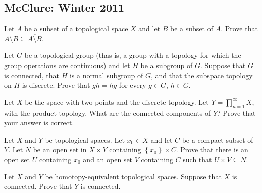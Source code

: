 \subsection{McClure: Winter 2011}
\setcounter{exercise}{0}

\begin{problem}
  Let $A$ be a subset of a topological space $X$ and let $B$ be a subset of
  $A$. Prove that $\bar A\setminus\bar B\subseteq\overline{A\setminus B}$.
\end{problem}
\begin{solution}
\end{solution}

\begin{problem}
  Let $G$ be a topological group (thas is, a group with a topology for
  which the group operations are continuous) and let $H$ be a subgroup of
  $G$. Suppose that $G$ is connected, that $H$ is a normal subgroup of $G$,
  and that the subspace topology on $H$ is discrete. Prove that
  $g h=hg$ for every $g\in G$, $h\in G$.
\end{problem}
\begin{solution}
\end{solution}

\begin{problem}
  Let $X$ be the space with two points and the discrete topology. Let
  $Y=\prod_{n=1}^\infty X$, with the product topology. What are the
  connected components of $Y$? Prove that your answer is correct.
\end{problem}
\begin{solution}
\end{solution}

\begin{problem}
  Let $X$ and $Y$ be topological spaces. Let $x_0\in X$ and let $C$ be a
  compact subset of $Y$. Let $N$ be an open set in $X\times Y$ containing
  $\left\{x_0\right\}\times C$. Prove that there is an open set $U$
  containing $x_0$ and an open set $V$ containing $C$ such that
  $U\times V\subseteq N$.
\end{problem}
\begin{solution}
\end{solution}

\begin{problem}
  Let $X$ and $Y$ be homotopy-equivalent topological spaces. Suppose that
  $X$ is connected. Prove that $Y$ is connected.
\end{problem}
\begin{solution}
\end{solution}


